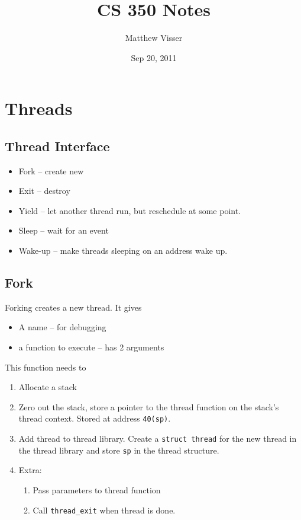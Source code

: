 \documentclass[12pt]{article}
\begin{document}
\title{CS 350 Notes}
\author{Matthew Visser}
\date{Sep 20, 2011}
\maketitle

\section{Threads}

\subsection{Thread Interface}

\begin{itemize} 
    \item Fork -- create new
    \item Exit -- destroy
    \item Yield -- let another thread run, but reschedule at some point.
    \item Sleep -- wait for an event
    \item Wake-up -- make threads sleeping on an address wake up.
\end{itemize}

\subsection{Fork}

Forking creates a new thread. It gives
\begin{itemize}
    \item A name -- for debugging
    \item a function to execute -- has 2 arguments
\end{itemize}

This function needs to 
\begin{enumerate}
    \item Allocate a stack
    \item Zero out the stack, store a pointer to the thread function on the
        stack's thread context. Stored at address \texttt{40(sp)}.
    \item Add thread to thread library. Create a \texttt{struct thread} for the
        new thread in the thread library and store \texttt{sp} in the thread
        structure.
    \item Extra:
        \begin{enumerate}
            \item Pass parameters to thread function
            \item Call \texttt{thread\_exit} when thread is done.
        \end{enumerate}
\end{enumerate}
\end{document}
